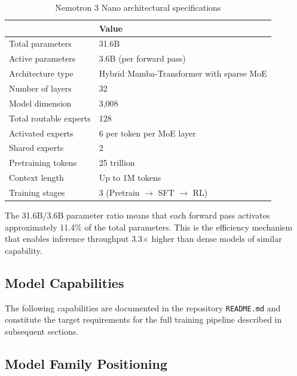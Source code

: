 \begin{table}[htbp]
  \centering
  \caption{Nemotron 3 Nano architectural specifications}
  \label{tab:nemotron-arch-specs}
  \begin{tabularx}{0.88\textwidth}{lX}
    \toprule
    \tableheader{Parameter & Value} \\
    \midrule
    Total parameters         & 31.6B \\
    \rowcolor{TableRowOdd}
    Active parameters        & 3.6B (per forward pass) \\
    Architecture type        & Hybrid Mamba-Transformer with sparse MoE \\
    \rowcolor{TableRowOdd}
    Number of layers         & 32 \\
    Model dimension          & 3,008 \\
    \rowcolor{TableRowOdd}
    Total routable experts   & 128 \\
    Activated experts        & 6 per token per MoE layer \\
    \rowcolor{TableRowOdd}
    Shared experts           & 2 \\
    Pretraining tokens       & 25 trillion \\
    \rowcolor{TableRowOdd}
    Context length           & Up to 1M tokens \\
    Training stages          & 3 (Pretrain $\to$ SFT $\to$ RL) \\
    \bottomrule
  \end{tabularx}
\end{table}

The 31.6B/3.6B parameter ratio means that each forward pass activates
approximately 11.4\% of the total parameters. This is the efficiency
mechanism that enables inference throughput 3.3$\times$ higher than dense
models of similar capability.

\subsection{Model Capabilities}
\label{subsec:nemotron-capabilities}

The following capabilities are documented in the repository
\texttt{README.md} and constitute the target requirements for the full
training pipeline described in subsequent sections.

\subsection{Model Family Positioning}
\label{subsec:model-family}

